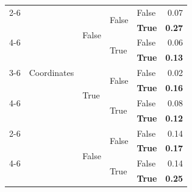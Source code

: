 \documentclass{article}
\begin{document}
\begin{table}
\begin{center}
{\begin{tabular}{@{}lllllr@{}}
    \cmidrule{2-6}
                                            & \multirow[c]{9}{*}{Coordinates}   & \multirow[c]{4}{*}{False} & \multirow[c]{2}{*}{False} & False                 & 0.07 \\
                                            &                                   &                           &                           & \textbf{True}         & \textbf{0.27} \\
    \cmidrule{4-6}
                                            &                                   &                           & \multirow[c]{2}{*}{True}  & False                 & 0.06 \\
                                            &                                   &                           &                           & \textbf{True}         & \textbf{0.13} \\
    \cmidrule{3-6}
                                            &                                   & \multirow[c]{4}{*}{True}  & \multirow[c]{2}{*}{False} & False                 & 0.02 \\
                                            &                                   &                           &                           & \textbf{True}         & \textbf{0.16} \\
    \cmidrule{4-6}
                                            &                                   &                           & \multirow[c]{2}{*}{True}  & False                 & 0.08 \\
                                            &                                   &                           &                           & \textbf{True}         & \textbf{0.12} \\
    \cmidrule{2-6}
                                            & \multirow[c]{9}{*}{RGB}           & \multirow[c]{4}{*}{False} & \multirow[c]{2}{*}{False} & False                 & 0.14 \\
                                            &                                   &                           &                           & \textbf{True}         & \textbf{0.17} \\
    \cmidrule{4-6}
                                            &                                   &                           & \multirow[c]{2}{*}{True}  & False                 & 0.14 \\
                                            &                                   &                           &                           & \textbf{True}         & \textbf{0.25} \\

\end{tabular}}
\end{center}
\end{table}
\end{document}
